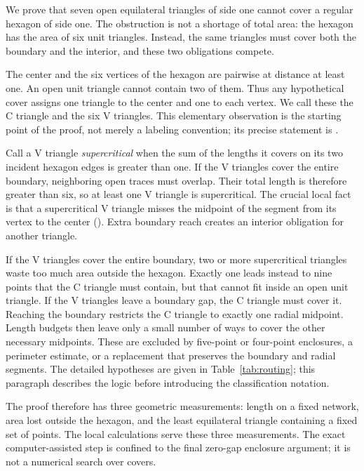 We prove that seven open equilateral triangles of side one cannot cover a
regular hexagon of side one. The obstruction is not a shortage of total
area: the hexagon has the area of six unit triangles. Instead, the same
triangles must cover both the boundary and the interior, and these two
obligations compete.

The center and the six vertices of the hexagon are pairwise at distance at
least one. An open unit triangle cannot contain two of them. Thus any
hypothetical cover assigns one triangle to the center and one to each
vertex. We call these the C triangle and the six V triangles. This elementary
observation is the starting point of the proof, not merely a labeling
convention; its precise statement is .

Call a V triangle \emph{supercritical} when the sum of the lengths it covers
on its two incident hexagon edges is greater than one. If the V triangles
cover the entire boundary, neighboring open traces must overlap. Their total
length is therefore greater than six, so at least one V triangle is
supercritical. The crucial local fact is that a supercritical V triangle
misses the midpoint of the segment from its vertex to the center
(). Extra boundary reach creates an interior
obligation for another triangle.

If the V triangles cover the entire boundary, two or more supercritical
triangles waste too much area outside the hexagon. Exactly one leads instead
to nine points that the C triangle must contain, but that cannot fit inside
an open unit triangle. If the V triangles leave a boundary gap, the C triangle
must cover it. Reaching the boundary restricts the C triangle to exactly one
radial midpoint. Length budgets then leave only a small number of ways to
cover the other necessary midpoints. These are excluded by five-point or
four-point enclosures, a perimeter estimate, or a replacement that preserves
the boundary and radial segments. The detailed hypotheses are given in
Table~\ref{tab:routing}; this paragraph describes the logic before introducing
the classification notation.

The proof therefore has three geometric measurements: length on a fixed
network, area lost outside the hexagon, and the least equilateral triangle
containing a fixed set of points. The local calculations serve these three
measurements. The exact computer-assisted step is confined to the final
zero-gap enclosure argument; it is not a numerical search over covers.

